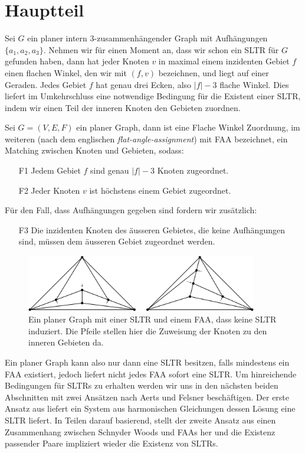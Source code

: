 \chapter{Hauptteil}

Sei $G$ ein planer intern 3-zusammenhängender Graph mit Aufhängungen $\{a_1,a_2,a_3\}$. Nehmen wir für einen Moment an, dass wir schon ein SLTR für $G$ gefunden haben, dann hat jeder Knoten $v$ in maximal einem inzidenten Gebiet $f$ einen flachen Winkel, den wir mit $(f,v)$ bezeichnen, und liegt auf einer Geraden. Jedes Gebiet $f$ hat genau drei Ecken, also $|f|-3$ flache Winkel. Dies liefert im Umkehrschluss eine notwendige Bedingung für die Existent einer SLTR, indem wir einen Teil der inneren Knoten den Gebieten zuordnen.

\begin{definition}[FAA]\label{def_faa}
Sei $G=(V,E,F)$ ein planer Graph, dann ist eine Flache Winkel Zuordnung, im weiteren (nach dem englischen \textit{flat-angle-assignment}) mit FAA bezeichnet, ein Matching zwischen Knoten und Gebieten, sodass:
\begin{itemize}
\item [F1] Jedem Gebiet $f$ sind genau $|f|-3$ Knoten zugeordnet.
\item [F2] Jeder Knoten $v$ ist höchstens einem Gebiet zugeordnet.
\end{itemize}
Für den Fall, dass Aufhängungen gegeben sind fordern wir zusätzlich:
\begin{itemize}
\item [F3] Die inzidenten Knoten des äusseren Gebietes, die keine Aufhängungen sind, müssen dem äusseren Gebiet zugeordnet werden.
\end{itemize}

\begin{figure}[h]
	\centering
  \includegraphics[width=0.9\textwidth]{faa_def.png}
  \caption{Ein planer Graph mit einer SLTR und einem FAA, dass keine SLTR induziert. Die Pfeile stellen hier die Zuweisung der Knoten zu den inneren Gebieten da.}
\end{figure}

\end{definition}

Ein planer Graph kann also nur dann eine SLTR besitzen, falls mindestens ein FAA existiert, jedoch liefert nicht jedes FAA sofort eine SLTR. Um hinreichende Bedingungen für SLTRs zu erhalten werden wir uns in den nächsten beiden Abschnitten mit zwei Ansätzen nach Aerts und Felsner beschäftigen. Der erste Ansatz aus \cite{af13} liefert ein System aus harmonischen Gleichungen dessen Lösung eine SLTR liefert. In Teilen darauf basierend, stellt der zweite Ansatz aus \cite{af15} einen Zusammenhang zwischen Schnyder Woods und FAAs her und die Existenz passender Paare impliziert wieder die Existenz von SLTRs.



